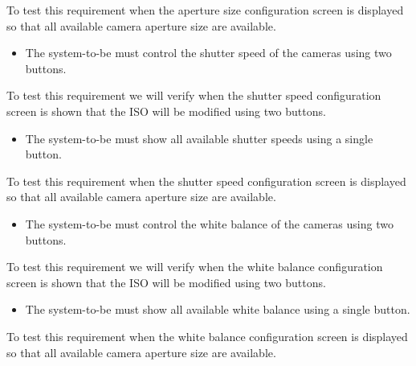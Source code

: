 To test this requirement when the aperture size configuration screen is displayed so that all available camera aperture size are available.
\begin{itemize}
    \item The system-to-be must control the shutter speed of the cameras using two buttons.
\end{itemize}
To test this requirement we will verify when the shutter speed configuration screen is shown that the ISO will be modified using two buttons.
\begin{itemize}
    \item The system-to-be must show all available shutter speeds using a single button.
\end{itemize}
To test this requirement when the shutter speed configuration screen is displayed so that all available camera aperture size are available.
\begin{itemize}
    \item The system-to-be must control the white balance of the cameras using two buttons.
\end{itemize}
To test this requirement we will verify when the white balance configuration screen is shown that the ISO will be modified using two buttons.
\begin{itemize}
    \item The system-to-be must show all available white balance using a single button.
\end{itemize}
To test this requirement when the white balance configuration screen is displayed so that all available camera aperture size are available.
